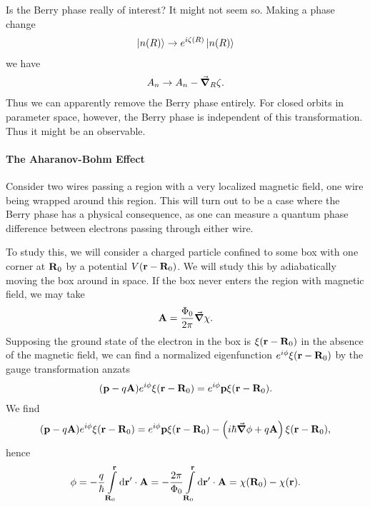 Is the Berry phase really of interest? It might not seem so. Making a phase change
\begin{align*}
	\ket{n(R)}\to e^{i\zeta(R)}\ket{n(R)}
\end{align*}
we have
\begin{align*}
	A_{n}\to A_{n} - \grad_{R}\zeta.
\end{align*}
Thus we can apparently remove the Berry phase entirely. For closed orbits in parameter space, however, the Berry phase is independent of this transformation. Thus it might be an observable.

\paragraph{The Aharanov-Bohm Effect}
Consider two wires passing a region with a very localized magnetic field, one wire being wrapped around this region. This will turn out to be a case where the Berry phase has a physical consequence, as one can measure a quantum phase difference between electrons passing through either wire.

To study this, we will consider a charged particle confined to some box with one corner at $\vb{R}_{0}$ by a potential $V(\vb{r} - \vb{R}_{0})$. We will study this by adiabatically moving the box around in space. If the box never enters the region with magnetic field, we may take
\begin{align*}
	\vb{A} = \frac{\Phi_{0}}{2\pi}\grad{\chi}.
\end{align*}
Supposing the ground state of the electron in the box is $\xi(\vb{r} - \vb{R}_{0})$ in the absence of the magnetic field, we can find a normalized eigenfunction $e^{i\phi}\xi(\vb{r} - \vb{R}_{0})$ by the gauge transformation anzats
\begin{align*}
	(\vb{p} - q\vb{A})e^{i\phi}\xi(\vb{r} - \vb{R}_{0}) = e^{i\phi}\vb{p}\xi(\vb{r} - \vb{R}_{0}).
\end{align*}
We find
\begin{align*}
	(\vb{p} - q\vb{A})e^{i\phi}\xi(\vb{r} - \vb{R}_{0}) = e^{i\phi}\vb{p}\xi(\vb{r} - \vb{R}_{0}) - \left(i\hbar\grad{\phi} + q\vb{A}\right)\xi(\vb{r} - \vb{R}_{0}),
\end{align*}
hence
\begin{align*}
	\phi = -\frac{q}{\hbar}\int\limits_{\vb{R}_{0}}^{\vb{r}}\dd{\vb{r}\ensuremath{^{\prime}}}\cdot\vb{A} = -\frac{2\pi}{\Phi_{0}}\int\limits_{\vb{R}_{0}}^{\vb{r}}\dd{\vb{r}\ensuremath{^{\prime}}}\cdot\vb{A} = \chi(\vb{R}_{0}) - \chi(\vb{r}).
\end{align*}

